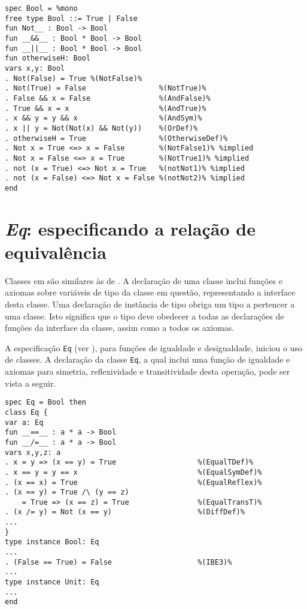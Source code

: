 \begin{Verbatim}
spec Bool = %mono
free type Bool ::= True | False 
fun Not__ : Bool -> Bool
fun __&&__ : Bool * Bool -> Bool
fun __||__ : Bool * Bool -> Bool
fun otherwiseH: Bool      
vars x,y: Bool
. Not(False) = True %(NotFalse)%
. Not(True) = False                 %(NotTrue)%
. False && x = False                %(AndFalse)%
. True && x = x                     %(AndTrue)%
. x && y = y && x                   %(AndSym)%
. x || y = Not(Not(x) && Not(y))    %(OrDef)%
. otherwiseH = True                 %(OtherwiseDef)%
. Not x = True <=> x = False        %(NotFalse1)% %implied
. Not x = False <=> x = True        %(NotTrue1)% %implied
. not (x = True) <=> Not x = True   %(notNot1)% %implied
. not (x = False) <=> Not x = False %(notNot2)% %implied
end
\end{Verbatim}

\section{\textit{Eq}: especificando a relação de equivalência}
Classes em \HasCASL são similares às de \Haskell.
A declaração de uma classe inclui funções e axiomas sobre variáveis de tipo da classe em questão, representando a interface desta classe.
Uma declaração de instância de tipo obriga um tipo a pertencer a uma classe.
Isto significa que o tipo deve obedecer a todas as declarações de funções da interface da classe, assim como a todos os axiomas.

A especificação \Verb.Eq. (ver ), para funções de igualdade e desigualdade, iniciou o uso de classes.
A declaração da classe \Verb.Eq., a qual inclui uma função de igualdade e axiomas para simetria, reflexividade e transitividade desta operação, pode ser vista a seguir.

\begin{Verbatim}
spec Eq = Bool then
class Eq {
var a: Eq
fun __==__ : a * a -> Bool
fun __/=__ : a * a -> Bool
vars x,y,z: a
. x = y => (x == y) = True                   %(EqualTDef)%
. x == y = y == x                            %(EqualSymDef)%
. (x == x) = True                            %(EqualReflex)%
. (x == y) = True /\ (y == z)                
    = True => (x == z) = True                %(EqualTransT)%
. (x /= y) = Not (x == y)                    %(DiffDef)%
...
}                                            
type instance Bool: Eq                       
...
. (False == True) = False                    %(IBE3)%
...
type instance Unit: Eq                       
...
end
\end{Verbatim}

